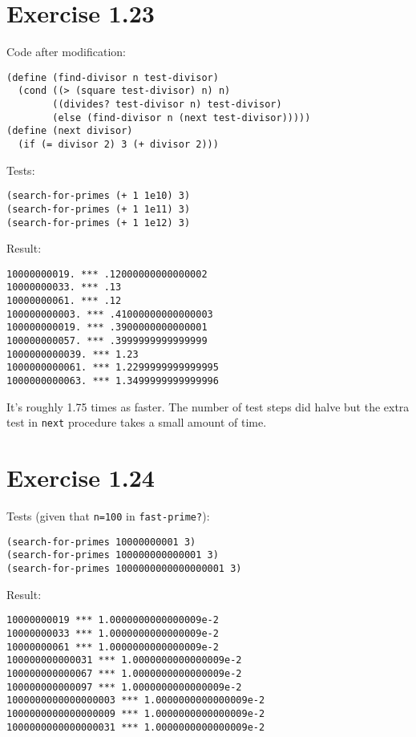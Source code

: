 \documentclass[../main.tex]{subfiles}
\begin{document}
\section{Exercise 1.23}

Code after modification:

\begin{lstlisting}
(define (find-divisor n test-divisor)
  (cond ((> (square test-divisor) n) n)
        ((divides? test-divisor n) test-divisor)
        (else (find-divisor n (next test-divisor)))))
(define (next divisor)
  (if (= divisor 2) 3 (+ divisor 2)))
\end{lstlisting}

Tests:

\begin{lstlisting}
(search-for-primes (+ 1 1e10) 3)
(search-for-primes (+ 1 1e11) 3)
(search-for-primes (+ 1 1e12) 3)
\end{lstlisting}

Result:

\begin{lstlisting}
10000000019. *** .12000000000000002
10000000033. *** .13
10000000061. *** .12
100000000003. *** .41000000000000003
100000000019. *** .3900000000000001
100000000057. *** .3999999999999999
1000000000039. *** 1.23
1000000000061. *** 1.2299999999999995
1000000000063. *** 1.3499999999999996
\end{lstlisting}

It's roughly 1.75 times as faster. The number of test steps
 did halve but the extra test in \lstinline{next} procedure
 takes a small amount of time.

\section{Exercise 1.24}

Tests (given that \lstinline{n=100} in \lstinline{fast-prime?}):

\begin{lstlisting}
(search-for-primes 10000000001 3)
(search-for-primes 100000000000001 3)
(search-for-primes 1000000000000000001 3)
\end{lstlisting}

Result:

\begin{lstlisting}
10000000019 *** 1.0000000000000009e-2
10000000033 *** 1.0000000000000009e-2
10000000061 *** 1.0000000000000009e-2
100000000000031 *** 1.0000000000000009e-2
100000000000067 *** 1.0000000000000009e-2
100000000000097 *** 1.0000000000000009e-2
1000000000000000003 *** 1.0000000000000009e-2
1000000000000000009 *** 1.0000000000000009e-2
1000000000000000031 *** 1.0000000000000009e-2
\end{lstlisting}
\end{document}
